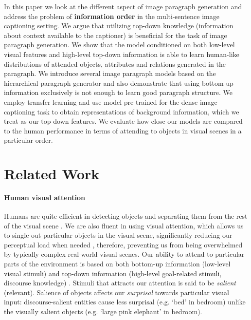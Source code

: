 \documentclass[11pt,a4paper]{article}
\begin{document}
In this paper we look at the different aspect of image paragraph generation and address the problem of \textbf{information order} in the multi-sentence image captioning setting.
We argue that utilizing top-down knowledge (information about context available to the captioner) is beneficial for the task of image paragraph generation.
We show that the model conditioned on both low-level visual features and high-level top-down information is able to learn human-like distributions of attended objects, attributes and relations generated in the paragraph.
We introduce several image paragraph models based on the hierarchical paragraph generator  and also
demonstrate that using bottom-up information exclusively is not enough to learn good paragraph structure.
We employ transfer learning and use model pre-trained for the dense image captioning task \cite{densecap} to obtain representations of background information, which we treat as our top-down features.
We evaluate how close our models are compared to the human performance in terms of attending to objects in visual scenes in a particular order.

\fi


\section{Related Work}

\iffalse
\paragraph{Human visual attention}
Humans are quite efficient in detecting objects and separating them from the rest of the visual scene \cite{Ullman87}.
We are also fluent in using visual attention, which allows us to single out particular objects in the visual scene, significantly reducing our perceptual load when needed \cite{Lavie04}, therefore, preventing us from being overwhelmed by typically complex real-world visual scenes.
Our ability to attend to particular parts of the environment is based on both bottom-up information (low-level visual stimuli) and top-down information (high-level goal-related stimuli, discourse knowledge) \cite{Zarcone2016}. %
Stimuli that attracts our attention is said to be \textit{salient} (relevant). Salience of objects affects our \textit{surprisal} towards particular visual input: discourse-salient entities cause less surprisal (e.g. `bed' in bedroom) unlike the visually salient objects (e.g. `large pink elephant' in bedroom).
\end{document}
